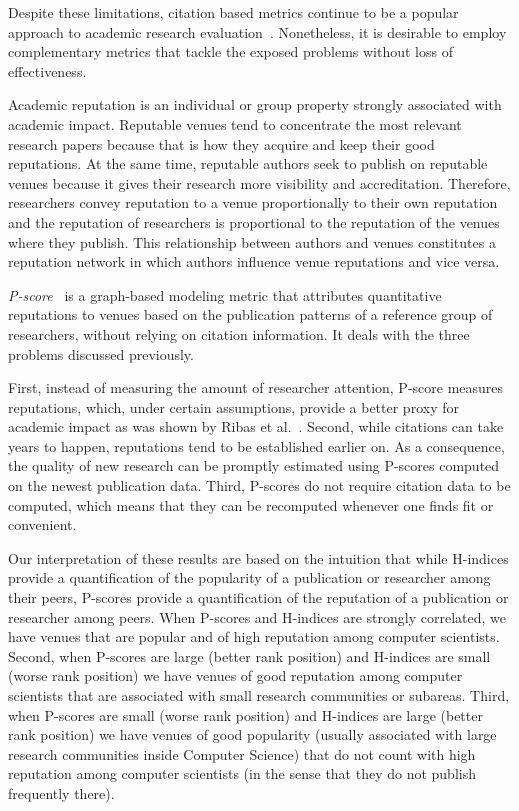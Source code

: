\documentclass[man]{apa6}
\begin{document}
Despite these limitations, citation based metrics continue to be a popular approach to
academic research evaluation~\cite{Kellner2008}.
Nonetheless, it is desirable to employ
complementary metrics that tackle the exposed problems without loss of effectiveness.

Academic reputation is an individual or group property strongly associated with 
academic impact. Reputable venues tend to concentrate the most relevant research papers 
because that is how they acquire and keep their good reputations. At the same time, 
reputable authors seek to publish on reputable venues because it gives their 
research more visibility and accreditation. Therefore, researchers convey reputation
to a venue proportionally to their own reputation and the reputation of researchers
is proportional to the reputation of the venues where they publish.
This relationship between authors and venues constitutes a reputation network in which 
authors influence venue reputations and vice versa. 

{\em P-score}~\cite{Ribas2015a} is a graph-based modeling metric that attributes quantitative
reputations to venues based on the publication patterns of a reference group of researchers,
without relying on citation information. It deals with the three problems discussed previously. 

First, instead of measuring the amount of researcher attention, P-score measures reputations,
which, under certain assumptions, provide a better proxy for academic impact as was shown by 
Ribas et al.~\cite{Ribas2015a}. Second, while citations can take years to happen, reputations 
tend to be established earlier on. As a consequence, the quality of new research can be 
promptly estimated using P-scores computed on the newest publication data. Third, P-scores do
not require citation data to be computed, which means that they can be recomputed whenever
one finds fit or convenient.

Our interpretation of these results are based on the intuition that while H-indices provide a 
quantification of the popularity of a publication or researcher among their peers, P-scores 
provide a quantification of the reputation of a publication or researcher among peers. When
P-scores and H-indices are strongly correlated, we have venues that are popular and of high
reputation among computer scientists. Second, when P-scores are large (better rank position) 
and H-indices are small (worse rank position) we have venues of good reputation among computer
scientists that are associated with small research communities or subareas. Third, when P-scores
are small (worse rank position) and H-indices are large (better rank position) we have venues of good popularity 
(usually associated with large research communities inside Computer Science) that do not count
with high reputation among computer scientists (in the sense that they do not publish frequently 
there).
\end{document}
